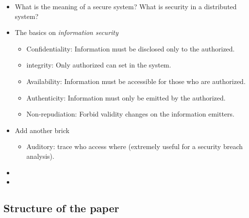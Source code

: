 \documentclass[10pt,a4paper,twoside]{llncs}
\begin{document}
\begin{itemize}
    \item What is the meaning of a secure system? What is security in a distributed system?
    \item The basics on \emph{information security}
    \begin{itemize}
        \item Confidentiality: Information must be disclosed only to the authorized.
        \item integrity: Only authorized can set in the system.
        \item Availability: Information must be accessible for those who are authorized.
        \item Authenticity: Information must only be emitted by the authorized.
        \item Non-repudiation: Forbid validity changes on the information emitters.
    \end{itemize}
    \item Add another brick
    \begin{itemize}
        \item Auditory: trace who access where (extremely useful for a security breach analysis).
    \end{itemize}
    \item
    \item
\end{itemize}


\subsection{Structure of the paper \label{sec:structurePaper}}
\end{document}
